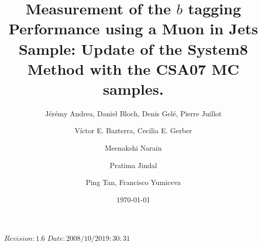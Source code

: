 \RCS$Revision: 1.6 $
\RCS$Date: 2008/10/20 19:30:31 $

 
\def\bb{$b\overline{b}\;$}
\def\cc{$c\overline{c}\;$}
\def\ttbar{$t\overline{t}\;$}
\def\mttbar{$m_{t\overline{t}}\;$}
\def\Zp{${Z'}\;$}
\def\ddZ{$\mathrm{d}\overline{\mathrm{d}}$}
\def\ss{$\mathrm{s}\overline{\mathrm{s}}\;$}
\def\ssZ{$\mathrm{s}\overline{\mathrm{s}}$}
\def\zqq{$\mathrm{Z} \rightarrow \mathrm{q}\overline{\mathrm{q}}\;$}
\def\zcc{$\mathrm{Z} \rightarrow \mathrm{c}\overline{\mathrm{c}}\;$}
\def\zbb{$\mathrm{Z} \rightarrow \mathrm{b}\overline{\mathrm{b}}\;$}
\def\zuuZ{$\mathrm{Z} \rightarrow \mathrm{u}\overline{\mathrm{u}}$}
\def\gevc{~GeV/$c\;$}
\def\gevcc{~GeV/$c^{2}\;$}
\def\mum{~$\mu$m$\;$}
\def\pt{$p_T\;$}
\def\ptZ{$p_T$}
\def\Et{$E_T\;$}
\def\EtZ{$E_T$}
\def\ip{$IP\;$}
\def\ipZ{$IP$}
\def\dca{$dca\;$}
\def\prob{${\cal P}_{jet}\;$}
\def\probZ{${\cal P}_{jet}$}
\def\dr{$\Delta R\;$}
\def\pscat{$p_{scat}\;$}
\def\pscatZ{$p_{scat}$}
\def\sip{${\cal S}_{IP}\;$}
\def\ptrel{$p_{Trel}\;$}
\def\tag{${\cal P}_{jet}^+<$}

\title{\bf Measurement of the $b$ tagging Performance using a Muon in Jets Sample: Update of the System8 Method with the CSA07 MC samples.}

\author[iphc]{J\'er\'emy Andrea, Daniel Bloch, Denis Gel\'e, Pierre Juillot}
\author[uic]{V\'ictor E. Bazterra, Cecilia E. Gerber}
\author[brown] {Meenakshi Narain}
\author[purdue]{Pratima Jindal}
\author[fnal]{Ping Tan, Francisco Yumiceva}
\address[uic]{University of Illinois at Chicago, Chicago, IL 60607, USA}
\address[iphc]{Institut Pluridisciplinaire Hubert Curien, Universit\'e Louis Pasteur, CNRS/IN2P3, Strasbourg, France}
\address[brown]{Brown University, Providence, RI 02912, USA}
\address[fnal]{Fermi National Accelerator Laboratory, Batavia, Illinois USA}  
\address[purdue]{Purdue University Calumet, Hammond, Indiana, USA}
\date{\today}
  

